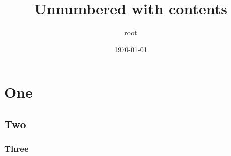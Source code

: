 \documentclass[11pt]{article}
\author{root}
\date{\today}
\title{Unnumbered with contents}
\begin{document}
\maketitle
\tableofcontents

\section*{One}
\label{sec:orgb9693bf}
\subsection*{Two}
\label{sec:orgd8aaa0a}
\subsubsection*{Three}
\label{sec:org99ef9c9}
\end{document}
